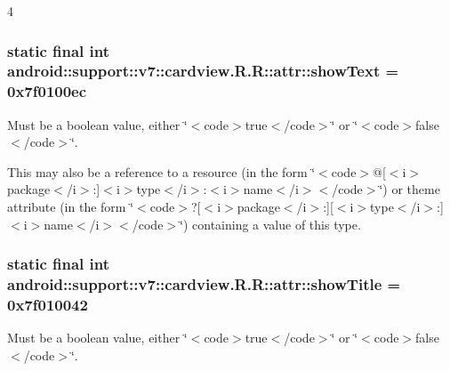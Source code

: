 4\hypertarget{classandroid_1_1support_1_1v7_1_1cardview_1_1_r_1_1attr_69b74108620f749421e759539073e05f}{
\subsubsection[{showText}]{\setlength{\rightskip}{0pt plus 5cm}static final int android::support::v7::cardview.R.R::attr::showText = 0x7f0100ec}}
\label{classandroid_1_1support_1_1v7_1_1cardview_1_1_r_1_1attr_69b74108620f749421e759539073e05f}


Must be a boolean value, either \char`\"{}$<$code$>$true$<$/code$>$\char`\"{} or \char`\"{}$<$code$>$false$<$/code$>$\char`\"{}. 

This may also be a reference to a resource (in the form \char`\"{}$<$code$>$@\mbox{[}$<$i$>$package$<$/i$>$:\mbox{]}$<$i$>$type$<$/i$>$:$<$i$>$name$<$/i$>$$<$/code$>$\char`\"{}) or theme attribute (in the form \char`\"{}$<$code$>$?\mbox{[}$<$i$>$package$<$/i$>$:\mbox{]}\mbox{[}$<$i$>$type$<$/i$>$:\mbox{]}$<$i$>$name$<$/i$>$$<$/code$>$\char`\"{}) containing a value of this type. \hypertarget{classandroid_1_1support_1_1v7_1_1cardview_1_1_r_1_1attr_f4746adb3ea1ce0706257304887816cf}{
\subsubsection[{showTitle}]{\setlength{\rightskip}{0pt plus 5cm}static final int android::support::v7::cardview.R.R::attr::showTitle = 0x7f010042}}
\label{classandroid_1_1support_1_1v7_1_1cardview_1_1_r_1_1attr_f4746adb3ea1ce0706257304887816cf}


Must be a boolean value, either \char`\"{}$<$code$>$true$<$/code$>$\char`\"{} or \char`\"{}$<$code$>$false$<$/code$>$\char`\"{}. 

